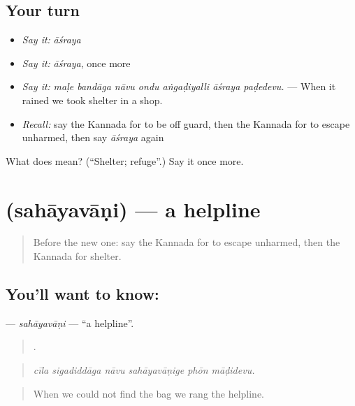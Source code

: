 \subsection*{Your turn}
\begin{itemize}
\raggedright
  \item \emph{Say it:} \emph{āśraya}
  \item \emph{Say it:} \emph{āśraya}, once more
  \item \emph{Say it:} \emph{maḷe bandāga nāvu ondu aṅgaḍiyalli āśraya paḍedevu.} — When it rained we took shelter in a shop.
  \item \emph{Recall:} say the Kannada for to be off guard, then the Kannada for to escape unharmed, then say \emph{āśraya} again
\end{itemize}

\begin{tcolorbox}[breakable,colback=teal!4,colframe=teal!35!black,title={Before you move on}]
What does  mean? (\textquotedblleft{}Shelter; refuge\textquotedblright{}.) Say it once more.
\end{tcolorbox}
\section[\texorpdfstring{\kn{ಸಹಾಯವಾಣಿ} (sahāyavāṇi)}{ಸಹಾಯವಾಣಿ (sahāyavāṇi)}]{ (sahāyavāṇi) — a helpline}

\label{lesson:KA-C472-sahayavani}



\begin{quote}
Before the new one: say the Kannada for to escape unharmed, then the Kannada for shelter.
\end{quote}

\subsection*{You'll want to know: }
\textbf{} — \emph{sahāyavāṇi} — \textquotedblleft{}a helpline\textquotedblright{}.

\begin{quote}
     .
\end{quote}

\begin{quote}
\emph{cīla sigadiddāga nāvu sahāyavāṇige phōn māḍidevu.}
\end{quote}

\begin{quote}
When we could not find the bag we rang the helpline.
\end{quote}


